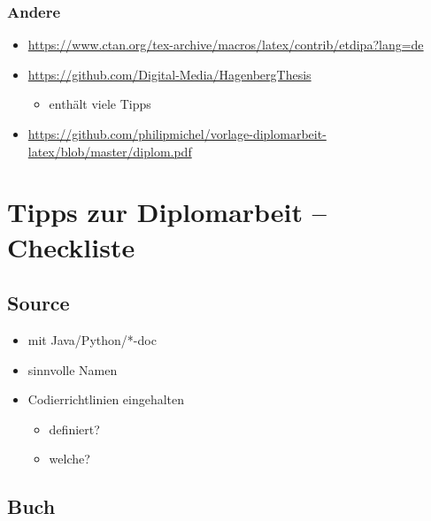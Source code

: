 \hypertarget{andere}{%
\subsubsection{Andere}\label{andere}}

\begin{itemize}
\tightlist
\item
  \url{https://www.ctan.org/tex-archive/macros/latex/contrib/etdipa?lang=de}
\item
  \url{https://github.com/Digital-Media/HagenbergThesis}

  \begin{itemize}
  \tightlist
  \item
    enthält viele Tipps
  \end{itemize}
\item
  \url{https://github.com/philipmichel/vorlage-diplomarbeit-latex/blob/master/diplom.pdf}
\end{itemize}

\hypertarget{tipps-zur-diplomarbeit-checkliste}{%
\section{Tipps zur Diplomarbeit --
Checkliste}\label{tipps-zur-diplomarbeit-checkliste}}

\hypertarget{source}{%
\subsection{Source}\label{source}}

\begin{itemize}
\tightlist
\item
  mit Java/Python/*-doc
\item
  sinnvolle Namen
\item
  Codierrichtlinien eingehalten

  \begin{itemize}
  \tightlist
  \item
    definiert?
  \item
    welche?
  \end{itemize}
\end{itemize}

\hypertarget{buch}{%
\subsection{Buch}\label{buch}}

